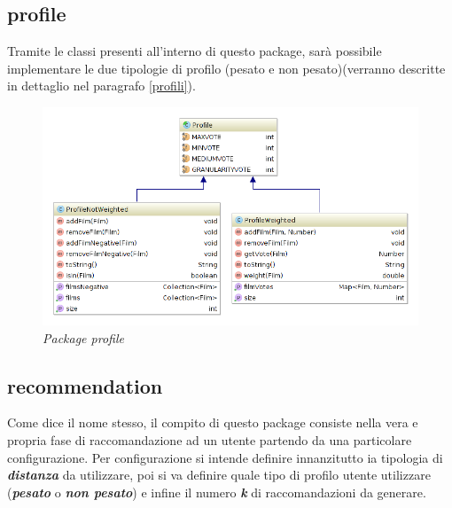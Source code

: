 \subsection{profile}
Tramite le classi presenti all'interno di questo package, sarà possibile implementare le due tipologie di profilo (pesato e non pesato)(verranno descritte in dettaglio nel paragrafo \ref{profili}).
\begin{figure}[H]
	\includegraphics[width=\textwidth]{./images/Diagrams/profile.png}
	\caption{\emph{Package profile}}
\end{figure}

\subsection{recommendation}
Come dice il nome stesso, il compito di questo package consiste nella vera e propria fase di raccomandazione ad un utente partendo da una particolare configurazione. Per configurazione si intende definire innanzitutto ia tipologia di \emph{\textbf{distanza}} da utilizzare, poi si va definire quale tipo di profilo utente utilizzare (\emph{\textbf{pesato}} o \emph{\textbf{non pesato}}) e infine il numero \emph{\textbf{k}} di raccomandazioni da generare.


